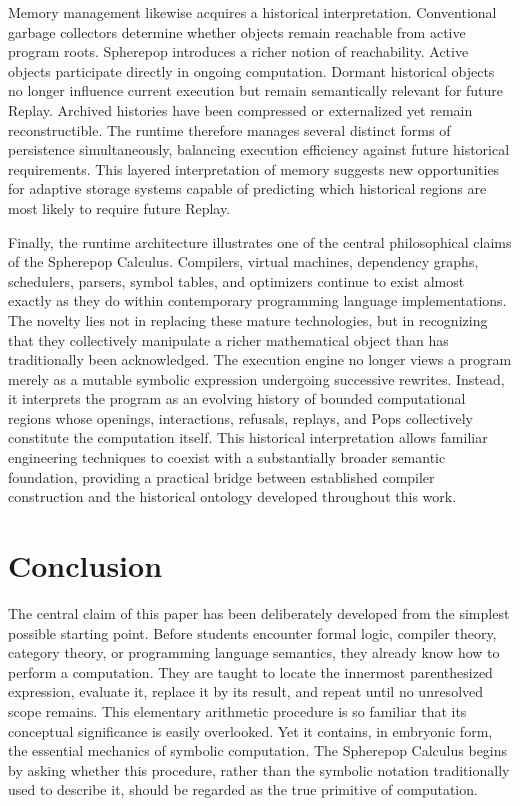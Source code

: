 \documentclass[12pt,oneside]{article}
\theoremstyle{definition}
\theoremstyle{remark}
\begin{document}
Memory management likewise acquires a historical interpretation. Conventional
garbage collectors determine whether objects remain reachable from active
program roots. Spherepop introduces a richer notion of reachability. Active
objects participate directly in ongoing computation. Dormant historical
objects no longer influence current execution but remain semantically relevant
for future Replay. Archived histories have been compressed or externalized yet
remain reconstructible. The runtime therefore manages several distinct forms
of persistence simultaneously, balancing execution efficiency against future
historical requirements. This layered interpretation of memory suggests new
opportunities for adaptive storage systems capable of predicting which
historical regions are most likely to require future Replay.

Finally, the runtime architecture illustrates one of the central philosophical
claims of the Spherepop Calculus. Compilers, virtual machines, dependency
graphs, schedulers, parsers, symbol tables, and optimizers continue to exist
almost exactly as they do within contemporary programming language
implementations. The novelty lies not in replacing these mature technologies,
but in recognizing that they collectively manipulate a richer mathematical
object than has traditionally been acknowledged. The execution engine no
longer views a program merely as a mutable symbolic expression undergoing
successive rewrites. Instead, it interprets the program as an evolving history
of bounded computational regions whose openings, interactions, refusals,
replays, and Pops collectively constitute the computation itself. This
historical interpretation allows familiar engineering techniques to coexist
with a substantially broader semantic foundation, providing a practical bridge
between established compiler construction and the historical ontology
developed throughout this work.


\section{Conclusion}

The central claim of this paper has been deliberately developed from the
simplest possible starting point. Before students encounter formal logic,
compiler theory, category theory, or programming language semantics, they
already know how to perform a computation. They are taught to locate the
innermost parenthesized expression, evaluate it, replace it by its result, and
repeat until no unresolved scope remains. This elementary arithmetic procedure
is so familiar that its conceptual significance is easily overlooked. Yet it
contains, in embryonic form, the essential mechanics of symbolic computation.
The Spherepop Calculus begins by asking whether this procedure, rather than
the symbolic notation traditionally used to describe it, should be regarded as
the true primitive of computation.
\end{document}
